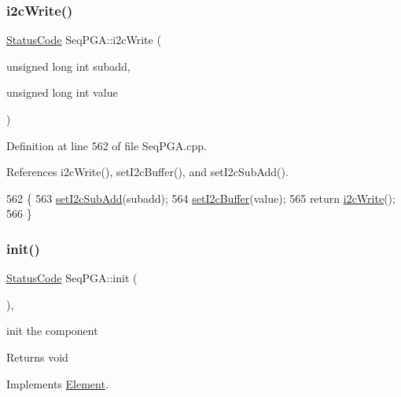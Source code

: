 \subsubsection{\texorpdfstring{i2c\+Write()}{i2cWrite()}\hspace{0.1cm}{\footnotesize\ttfamily [2/2]}}
{\footnotesize\ttfamily \hyperlink{classStatusCode}{Status\+Code} Seq\+P\+G\+A\+::i2c\+Write (\begin{DoxyParamCaption}\item[{unsigned long int}]{subadd,  }\item[{unsigned long int}]{value }\end{DoxyParamCaption})}



Definition at line 562 of file Seq\+P\+G\+A.\+cpp.



References i2c\+Write(), set\+I2c\+Buffer(), and set\+I2c\+Sub\+Add().


\begin{DoxyCode}
562                                                                             \{
563   \hyperlink{classSeqPGA_a348c5d982223fb5cf2878e5bf3c6429c}{setI2cSubAdd}(subadd);
564   \hyperlink{classSeqPGA_ab93beca49a31c1f9fddc915e9efeeaa0}{setI2cBuffer}(value);
565   \textcolor{keywordflow}{return} \hyperlink{classSeqPGA_a429076ca3a4ece94182bd95c623bb9d0}{i2cWrite}();
566 \}
\end{DoxyCode}
\mbox{\label{classSeqPGA_aba1ead90de9e6f14042d8838db5ebe5b}} 
\subsubsection{\texorpdfstring{init()}{init()}}
{\footnotesize\ttfamily \hyperlink{classStatusCode}{Status\+Code} Seq\+P\+G\+A\+::init (\begin{DoxyParamCaption}{ }\end{DoxyParamCaption})\hspace{0.3cm}{\ttfamily [inline]}, {\ttfamily [virtual]}}

init the component

\begin{DoxyReturn}{Returns}
void 
\end{DoxyReturn}


Implements \hyperlink{classElement_af42754b5cabc198869222725218d695c}{Element}.




